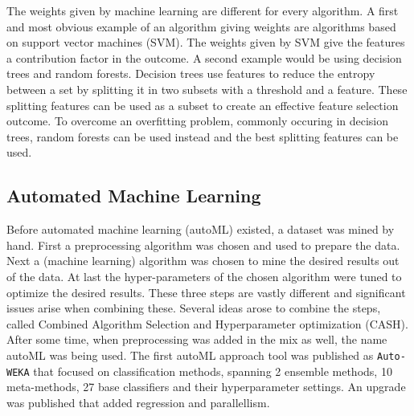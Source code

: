 \documentclass[10pt,a4paper]{article}
\begin{document}
	The weights given by machine learning are different for every algorithm. A first and most obvious example of an algorithm giving weights are algorithms based on support vector machines (SVM). The weights given by SVM give the features a contribution factor in the outcome\cite{jong2004feature, prados2004mining, zhang2006recursive, guyon2002gene}. A second example would be using decision trees and random forests. Decision trees use features to reduce the entropy between a set by splitting it in two subsets with a threshold and a feature. These splitting features can be used as a subset to create an effective feature selection outcome\cite{geurts2005proteomic, wu2003comparison, Duch2006}. To overcome an overfitting problem, commonly occuring in decision trees, random forests can be used instead and the best splitting features can be used\cite{liaw2002classification}.

	
	
	
	
	
	\subsection{Automated Machine Learning}
	\label{subsec:AutomatedMachineLearning}
	
	Before automated machine learning (autoML) existed, a dataset was mined by hand. First a preprocessing algorithm was chosen and used to prepare the data. Next a (machine learning) algorithm was chosen to mine the desired results out of the data. At last the hyper-parameters of the chosen algorithm were tuned to optimize the desired results. These three steps are vastly different and significant issues arise when combining these. Several ideas arose to combine the steps, called Combined Algorithm Selection and Hyperparameter optimization (CASH)\cite{thornton2013auto}. After some time, when preprocessing was added in the mix as well, the name autoML was being used\cite{Gijsbers2017Thesis}. The first autoML approach tool was published as \texttt{Auto-WEKA} that focused on classification methods, spanning 2 ensemble methods, 10 meta-methods, 27 base classifiers and their hyperparameter settings\cite{thornton2013auto}. An upgrade was published that added regression and parallellism\cite{kotthoff2016auto}.   
	
\end{document}
